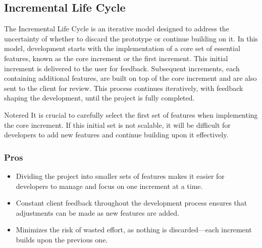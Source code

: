 \vspace{1cm}
\subsection{Incremental Life Cycle}
The Incremental Life Cycle is an iterative model designed to address the uncertainty of whether to discard the prototype or
continue building on it. 
In this model, development starts with the implementation of a core set of essential features, known as the core increment or
the first increment. This initial increment is delivered to the user for feedback. 
Subsequent increments, each containing additional features, are built on top of the core increment and are also sent to the 
client for review. This process continues iteratively, with feedback shaping the development, until the project is fully completed.

\vspace{0.5cm}

\begin{prettyBox}{Note}{red}
    It is crucial to carefully select the first set of features when implementing the core increment. If this initial set
    is not scalable, it will be difficult for developers to add new features and continue building upon it effectively.
\end{prettyBox}

\vspace{2cm}
\begin{center}
\end{center}

\subsubsection{Pros}
\begin{itemize}
    \item Dividing the project into smaller sets of features makes it easier for developers to manage and focus on one
increment at a time.
    \item Constant client feedback throughout the development process ensures that adjustments can be made as new
features are added.
    \item Minimizes the risk of wasted effort, as nothing is discarded—each increment builds upon the previous one.
\end{itemize}

